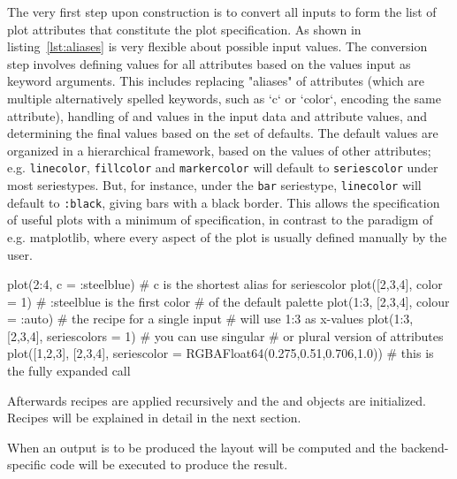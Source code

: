 The very first step upon construction is to convert all inputs to form the list of plot attributes that constitute the plot specification.
As shown in listing~\ref{lst:aliases} \Plots is very flexible about possible input values.
The conversion step involves defining values for all attributes based on the values input as keyword arguments.
This includes replacing "aliases" of attributes (which are multiple alternatively spelled keywords, such as `c` or `color`, encoding the same attribute), handling of  and  values in the input data and attribute values, and determining the final values based on the set of defaults.
The default values are organized in a hierarchical framework, based on the values of other attributes; e.g. \texttt{linecolor}, \texttt{fillcolor} and \texttt{markercolor} will default to \texttt{seriescolor} under most seriestypes.
But, for instance, under the \texttt{bar} seriestype, \texttt{linecolor} will default to \texttt{:black}, giving bars with a black border.
This allows the specification of useful plots with a minimum of specification, in contrast to the paradigm of e.g. matplotlib, where every aspect of the plot is usually defined manually by the user.

\begin{code}[caption=Examples of input preprocessing steps in \Plots. All these calls are equivalent., label=lst:aliases]
plot(2:4, c = :steelblue)                # c is the shortest alias for seriescolor
plot([2,3,4], color = 1)                 # :steelblue is the first color
                                         # of the default palette
plot(1:3, [2,3,4], colour = :auto)       # the recipe for a single input
                                         # will use 1:3 as x-values
plot(1:3, [2,3,4], seriescolors = 1)     # you can use singular
                                         # or plural version of attributes
plot([1,2,3], [2,3,4], seriescolor = RGBA{Float64}(0.275,0.51,0.706,1.0))
# this is the fully expanded call
\end{code}

Afterwards recipes are applied recursively and the  and  objects are initialized.
Recipes will be explained in detail in the next section.

When an output is to be produced the layout will be computed and the backend-specific code will be executed to produce the result.

